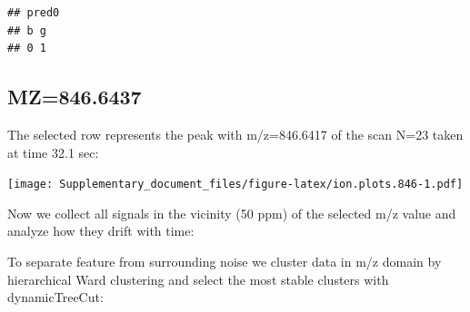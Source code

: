 \documentclass[]{article}
\newenvironment{Shaded}{\begin{snugshade}}{\end{snugshade}}
\newcommand{\KeywordTok}[1]{\textcolor[rgb]{0.13,0.29,0.53}{\textbf{#1}}}
\newcommand{\FloatTok}[1]{\textcolor[rgb]{0.00,0.00,0.81}{#1}}
\newcommand{\StringTok}[1]{\textcolor[rgb]{0.31,0.60,0.02}{#1}}
\newcommand{\OperatorTok}[1]{\textcolor[rgb]{0.81,0.36,0.00}{\textbf{#1}}}
\newcommand{\NormalTok}[1]{#1}
\begin{document}
\begin{verbatim}
## pred0
## b g 
## 0 1
\end{verbatim}

\subsection{MZ=846.6437}\label{mz846.6437}

\begin{Shaded}
\end{Shaded}

The selected row represents the peak with m/z=846.6417 of the scan N=23
taken at time 32.1 sec:

\begin{Shaded}
\end{Shaded}

\texttt{[image: Supplementary\_document\_files/figure-latex/ion.plots.846-1.pdf]}

Now we collect all signals in the vicinity (50 ppm) of the selected m/z
value and analyze how they drift with time:

\begin{Shaded}
\end{Shaded}

To separate feature from surrounding noise we cluster data in m/z domain
by hierarchical Ward clustering and select the most stable clusters with
dynamicTreeCut:
\end{document}
